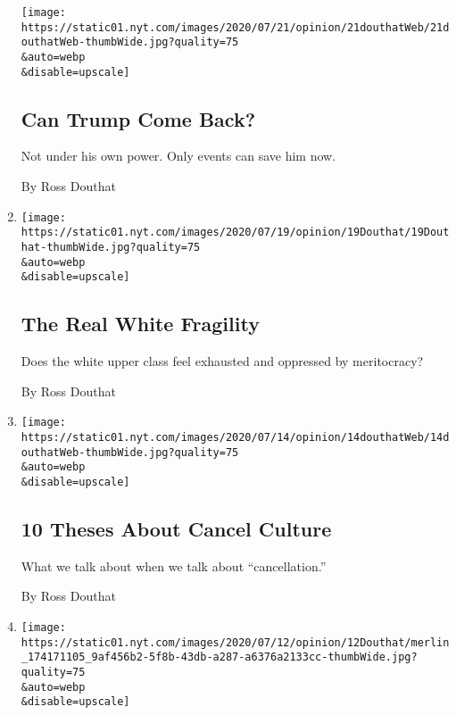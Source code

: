 \begin{enumerate}
  \texttt{[image: https://static01.nyt.com/images/2020/07/21/opinion/21douthatWeb/21douthatWeb-thumbWide.jpg?quality=75\\\&auto=webp\\\&disable=upscale]}

  \hypertarget{can-trump-come-back}{%
  \subsection{Can Trump Come Back?}\label{can-trump-come-back}}

  Not under his own power. Only events can save him now.

  By Ross Douthat
\item
  \href{/2020/07/18/opinion/sunday/white-fragility-meritocracy.html}{}

  \texttt{[image: https://static01.nyt.com/images/2020/07/19/opinion/19Douthat/19Douthat-thumbWide.jpg?quality=75\\\&auto=webp\\\&disable=upscale]}

  \hypertarget{the-real-white-fragility}{%
  \subsection{The Real White Fragility}\label{the-real-white-fragility}}

  Does the white upper class feel exhausted and oppressed by
  meritocracy?

  By Ross Douthat
\item
  \href{/2020/07/14/opinion/cancel-culture-.html}{}

  \texttt{[image: https://static01.nyt.com/images/2020/07/14/opinion/14douthatWeb/14douthatWeb-thumbWide.jpg?quality=75\\\&auto=webp\\\&disable=upscale]}

  \hypertarget{10-theses-about-cancel-culture}{%
  \subsection{10 Theses About Cancel
  Culture}\label{10-theses-about-cancel-culture}}

  What we talk about when we talk about ``cancellation.''

  By Ross Douthat
\item
  \href{/2020/07/11/opinion/sunday/china-coronavirus-power.html}{}

  \texttt{[image: https://static01.nyt.com/images/2020/07/12/opinion/12Douthat/merlin\_174171105\_9af456b2-5f8b-43db-a287-a6376a2133cc-thumbWide.jpg?quality=75\\\&auto=webp\\\&disable=upscale]}

  \hypertarget{the-chinese-decade}{%
}
\end{enumerate}
